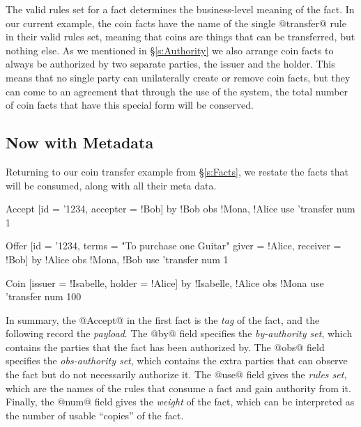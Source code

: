 The valid rules set for a fact determines the business-level meaning of the fact. In our current example, the coin facts have the name of the single @transfer@ rule in their valid rules set, meaning that coins are things that can be transferred, but nothing else. As we mentioned in \S\ref{s:Authority} we also arrange coin facts to always be authorized by two separate parties, the issuer and the holder. This means that no single party can unilaterally create or remove coin facts, but they can come to an agreement that through the use of the system, the total number of coin facts that have this special form will be conserved.


\subsection{Now with Metadata}
\label{s:NowWithMetadata}

Returning to our coin transfer example from \S\ref{s:Facts}, we restate the facts that will be consumed, along with all their meta data.

\begin{small}
\begin{code}
 Accept [id = '1234, accepter = !Bob]
    by  {!Bob}                obs {!Mona, !Alice}
    use {'transfer}           num 1

 Offer  [id = '1234, terms = "To purchase one Guitar"
         giver = !Alice, receiver = !Bob]
    by  {!Alice}              obs {!Mona, !Bob}
    use {'transfer}           num 1

 Coin   [issuer = !Isabelle, holder  = !Alice]
    by  {!Isabelle, !Alice}   obs {!Mona}
    use {'transfer}           num 100
\end{code}
\end{small}

In summary, the @Accept@ in the first fact is the \emph{tag} of the fact, and the following record the \emph{payload}. The @by@ field specifies the \emph{by-authority set}, which contains the parties that the fact has been authorized by. The @obs@ field specifies the \emph{obs-authority set}, which contains the extra parties that can observe the fact but do not necessarily authorize it. The @use@ field gives the \emph{rules set}, which are the names of the rules that consume a fact and gain authority from it. Finally, the @num@ field gives the \emph{weight} of the fact, which can be interpreted as the number of usable ``copies'' of the fact.

